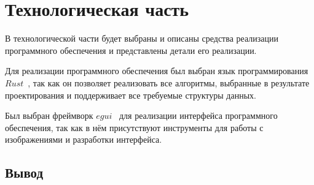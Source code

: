 \chapter{Технологическая часть}
В технологической части будет выбраны и описаны средства реализации программного обеспечения и представлены детали его реализации.

Для реализации программного обеспечения был выбран язык программирования $Rust$~\cite{rust2024}, так как он позволяет реализовать все алгоритмы, выбранные в результате проектирования и поддерживает все требуемые структуры данных.

Был выбран фреймворк $egui$~\cite{egui2024} для реализации интерфейса программного обеспечения, так как в нём присутствуют инструменты для работы с изображениями и разработки интерфейса.
\section*{Вывод}
